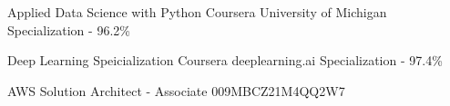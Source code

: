 


\begin{cvskills}


\cvskill
{Applied Data Science with Python}
{Coursera University of Michigan Specialization - 96.2\%}


\cvskill
{Deep Learning Speicialization}
{Coursera deeplearning.ai Specialization - 97.4\%}


\cvskill
{AWS Solution Architect - Associate}
{009MBCZ21M4QQ2W7}


\end{cvskills}